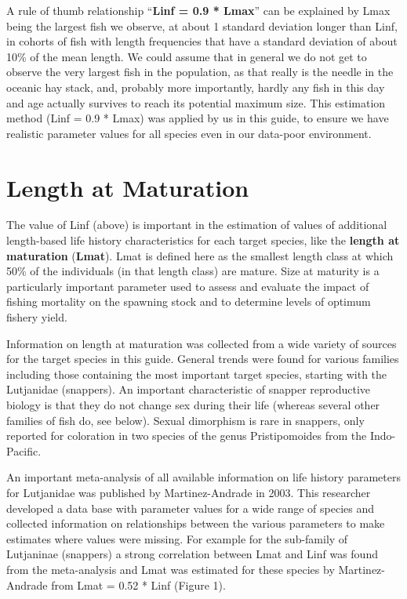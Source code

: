 A rule of thumb relationship ``\textbf{Linf =  0.9 * Lmax}'' can be explained by Lmax being the largest fish we observe, at about 1 standard deviation longer than Linf, in cohorts of fish with length frequencies that have a standard deviation of about 10\% of the mean length. We could assume that in general we do not get to observe the very largest fish in the population, as that really is the needle in the oceanic hay stack, and, probably more importantly, hardly any fish in this day and age actually survives to reach its potential maximum size. This estimation method (Linf =  0.9 * Lmax) was applied by us in this guide, to ensure we have realistic parameter values for all species even in our data-poor environment.

\section{Length at Maturation}
The  value of Linf (above) is important in the estimation of values of additional length-based life history characteristics for each target species, like the \textbf{length at maturation} (\textbf{Lmat}). Lmat is defined here as the smallest length class at which 50\% of the individuals (in that length class) are mature. Size at maturity is a particularly important parameter used to assess and evaluate the impact of fishing mortality on the spawning stock and to determine levels of optimum fishery yield.

Information on length at maturation was collected from a wide variety of sources for the target species in this guide. General trends were found for various families including those containing the most important target species, starting with the Lutjanidae (snappers). An important characteristic of snapper reproductive biology is that they do not change sex during their life (whereas several other families of fish do, see below). Sexual dimorphism is rare in snappers, only reported for coloration in two species of the genus Pristipomoides from the Indo-Pacific.

An important meta-analysis of all available information on life history parameters for Lutjanidae was published by Martinez-Andrade in 2003. This researcher developed a data base with parameter values for a wide range of species and collected information on relationships between the various parameters to make estimates where values were missing. For example for the sub-family of Lutjaninae (snappers) a strong correlation between Lmat and Linf was found from the meta-analysis and Lmat was estimated for these species by Martinez-Andrade from Lmat = 0.52 * Linf (Figure 1).

